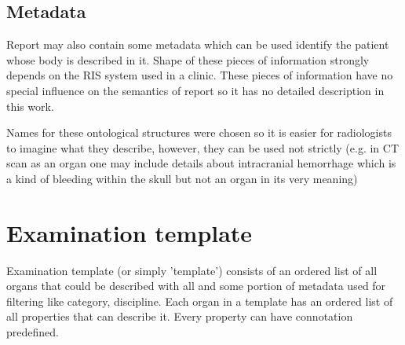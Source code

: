 \documentclass[12pt, twoside, openany]{report}
\theoremstyle{definition}
\begin{document}
\subsection{Metadata}
Report may also contain some metadata which can be used identify the patient whose body is described in it. Shape of these pieces of information strongly depends on the RIS system used in a clinic. These pieces of information have no special influence on the semantics of report so it has no detailed description in this work.

Names for these ontological structures were chosen so it is easier for radiologists to imagine what they describe, however, they can be used not strictly (e.g. in CT scan as an organ one may include details about intracranial hemorrhage which is a kind of bleeding within the skull \cite{ich} but not an organ in its very meaning)

\section{Examination template}
Examination template (or simply 'template') consists of an ordered list of all organs that could be described with all and some portion of metadata used for filtering like category, discipline. Each organ in a template has an ordered list of all properties that can describe it. Every property can have connotation predefined. 
\end{document}
